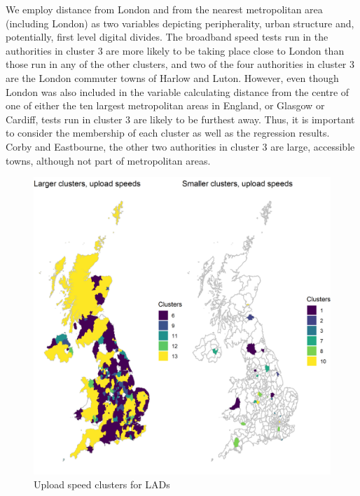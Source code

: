 \documentclass[Royal,times,sageh]{sagej}
\begin{document}
We employ distance from London and from the nearest metropolitan area
(including London) as two variables depicting peripherality, urban
structure and, potentially, first level digital divides. The broadband
speed tests run in the authorities in cluster \(3\) are more likely to
be taking place close to London than those run in any of the other
clusters, and two of the four authorities in cluster \(3\) are the
London commuter towns of Harlow and Luton. However, even though London
was also included in the variable calculating distance from the centre
of one of either the ten largest metropolitan areas in England, or
Glasgow or Cardiff, tests run in cluster \(3\) are likely to be furthest
away. Thus, it is important to consider the membership of each cluster
as well as the regression results. Corby and Eastbourne, the other two
authorities in cluster \(3\) are large, accessible towns, although not
part of metropolitan areas.

\begin{figure}
\includegraphics[width=0.95\linewidth]{figures/map.up.clusters} \caption{\label{map.up.clusters}Upload speed clusters for LADs}\label{fig:unnamed-chunk-6}
\end{figure}
\end{document}
